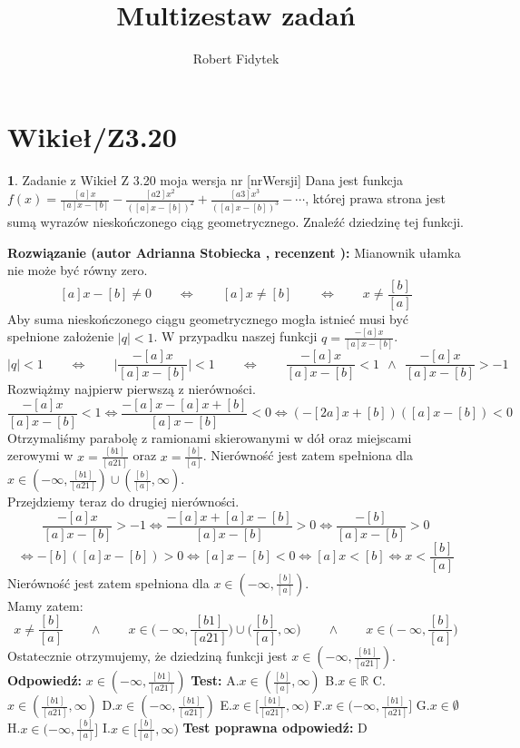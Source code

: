 \documentclass[12pt, a4paper]{article}
\title{Multizestaw zadań}
\author{Robert Fidytek}
\date{}
\theoremstyle{definition} %
\newtheorem{zad}{}
\newcommand{\kategoria}[1]{\section{#1}} %
\newcommand{\zadStart}[1]{\begin{zad}#1\newline} %
\newcommand{\zadStop}{\end{zad}}   %
\newcommand{\rozwStart}[2]{\noindent \textbf{Rozwiązanie (autor #1 , recenzent #2): }\newline} %
\newcommand{\rozwStop}{\newline}                                            %
\newcommand{\odpStart}{\noindent \textbf{Odpowiedź:}\newline}    %
\newcommand{\odpStop}{\newline}                                             %
\newcommand{\testStart}{\noindent \textbf{Test:}\newline} %
\newcommand{\testStop}{\newline} %
\newcommand{\kluczStart}{\noindent \textbf{Test poprawna odpowiedź:}\newline} %
\newcommand{\kluczStop}{\newline} %
\begin{document}
\maketitle


\kategoria{Wikieł/Z3.20}
\zadStart{Zadanie z Wikieł Z 3.20 moja wersja nr [nrWersji]}
Dana jest funkcja $f(x)=\frac{[a]x}{[a]x-[b]}-\frac{[a2]x^2}{([a]x-[b])^2}+\frac{[a3]x^3}{([a]x-[b])^3}-\cdots$, której prawa strona jest sumą wyrazów nieskończonego ciąg geometrycznego. Znaleźć dziedzinę tej funkcji.
\zadStop
\rozwStart{Adrianna Stobiecka}{}
Mianownik ułamka nie może być równy zero.
$$[a]x-[b]\ne0\qquad\Leftrightarrow\qquad[a]x\ne[b]\qquad\Leftrightarrow\qquad x\ne\frac{[b]}{[a]}$$
Aby suma nieskończonego ciągu geometrycznego mogła istnieć musi być spełnione założenie $|q|<1$. W przypadku naszej funkcji $q=\frac{-[a]x}{[a]x-[b]}$. 
$$|q|<1\qquad\Leftrightarrow\qquad \bigg|\frac{-[a]x}{[a]x-[b]}\bigg|<1\qquad\Leftrightarrow\qquad \frac{-[a]x}{[a]x-[b]}<1 ~~\land~~\frac{-[a]x}{[a]x-[b]}>-1$$
Rozwiążmy najpierw pierwszą z nierówności.
$$\frac{-[a]x}{[a]x-[b]}<1\Leftrightarrow\frac{-[a]x-[a]x+[b]}{[a]x-[b]}<0\Leftrightarrow(-[2a]x+[b])([a]x-[b])<0$$
Otrzymaliśmy parabolę z ramionami skierowanymi w dół oraz miejscami zerowymi w $x=\frac{[b1]}{[a21]}$ oraz $x=\frac{[b]}{[a]}$. Nierówność jest zatem spełniona dla $x\in(-\infty,\frac{[b1]}{[a21]})\cup(\frac{[b]}{[a]},\infty)$.
\\Przejdziemy teraz do drugiej nierówności.
$$\frac{-[a]x}{[a]x-[b]}>-1\Leftrightarrow\frac{-[a]x+[a]x-[b]}{[a]x-[b]}>0\Leftrightarrow\frac{-[b]}{[a]x-[b]}>0$$
$$\Leftrightarrow-[b]([a]x-[b])>0\Leftrightarrow[a]x-[b]<0\Leftrightarrow[a]x<[b]\Leftrightarrow x<\frac{[b]}{[a]}$$
 Nierówność jest zatem spełniona dla $x\in(-\infty,\frac{[b]}{[a]})$.
\\Mamy zatem:
$$x\ne\frac{[b]}{[a]}\qquad\land\qquad x\in\bigg(-\infty,\frac{[b1]}{[a21]}\bigg)\cup\bigg(\frac{[b]}{[a]},\infty\bigg)\qquad\land\qquad x\in\bigg(-\infty,\frac{[b]}{[a]}\bigg)$$
Ostatecznie otrzymujemy, że dziedziną funkcji jest $x\in(-\infty,\frac{[b1]}{[a21]})$.
\rozwStop
\odpStart
$x\in(-\infty,\frac{[b1]}{[a21]})$
\odpStop
\testStart
A.$x\in(\frac{[b]}{[a]},\infty)$
B.$x\in\mathbb{R}$
C.$x\in(\frac{[b1]}{[a21]},\infty)$
D.$x\in(-\infty,\frac{[b1]}{[a21]})$
E.$x\in[\frac{[b1]}{[a21]},\infty)$
F.$x\in(-\infty,\frac{[b1]}{[a21]}]$
G.$x\in\emptyset$
H.$x\in(-\infty,\frac{[b]}{[a]}]$
I.$x\in[\frac{[b]}{[a]},\infty)$
\testStop
\kluczStart
D
\kluczStop
\end{document}
